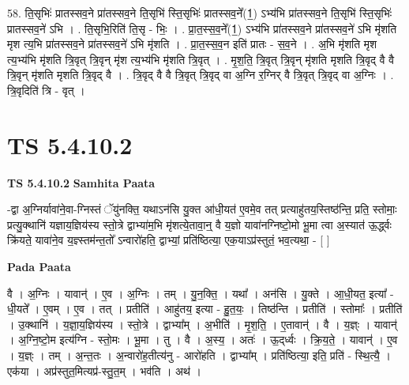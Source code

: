\documentclass[17pt]{extarticle}
\begin{document}
58. ति॒सृभिः॑ प्रातस्सव॒ने प्रा॑तस्सव॒ने ति॒सृभि॑ स्ति॒सृभिः॑ प्रातस्सव॒ने᳚(1॒) ऽभ्य॑भि प्रा॑तस्सव॒ने ति॒सृभि॑ स्ति॒सृभिः॑ प्रातस्सव॒ने॑ ऽभि । . ति॒सृभि॒रिति॑ ति॒सृ - भिः॒ । . प्रा॒त॒स्स॒व॒ने᳚(1॒) ऽभ्य॑भि प्रा॑तस्सव॒ने प्रा॑तस्सव॒ने॑ ऽभि मृ॑शति मृश त्य॒भि प्रा॑तस्सव॒ने प्रा॑तस्सव॒ने॑ ऽभि मृ॑शति । . प्रा॒त॒स्स॒व॒न इति॑ प्रातः - स॒व॒ने । . अ॒भि मृ॑शति मृश त्य॒भ्य॑भि मृ॑शति त्रि॒वृत् त्रि॒वृन् मृ॑श त्य॒भ्य॑भि मृ॑शति त्रि॒वृत् । . मृ॒श॒ति॒ त्रि॒वृत् त्रि॒वृन् मृ॑शति मृशति त्रि॒वृद् वै वै त्रि॒वृन् मृ॑शति मृशति त्रि॒वृद् वै । . त्रि॒वृद् वै वै त्रि॒वृत् त्रि॒वृद् वा अ॒ग्नि र॒ग्निर् वै त्रि॒वृत् त्रि॒वृद् वा अ॒ग्निः । . त्रि॒वृदिति॑ त्रि - वृत् । \newline
\pagebreak
{}

\section{ TS 5.4.10.2 }

\textbf{TS 5.4.10.2 } \newline
\textbf{Samhita Paata} \newline

-द्वा अ॒ग्निर्यावा॑ने॒वा-ग्निस्तं ॅयु॑नक्ति॒ यथाऽन॑सि यु॒क्त आ॑धी॒यत॑ ए॒वमे॒व तत् प्रत्याहु॑तय॒स्तिष्ठ॑न्ति॒ प्रति॒ स्तोमाः॒ प्रत्यु॒क्थानि॑ यज्ञाय॒ज्ञिय॑स्य स्तो॒त्रे द्वाभ्या॑म॒भि मृ॑शत्ये॒तावा॒न्॒ वै य॒ज्ञो यावा॑नग्निष्टो॒मो भू॒मा त्वा अ॒स्यात॑ ऊ॒र्द्ध्वः क्रि॑यते॒ यावा॑ने॒व य॒ज्ञ्स्तम॑न्त॒तो᳚ ऽन्वारो॑हति॒ द्वाभ्यां॒ प्रति॑ष्ठित्या॒ एक॒याऽप्र॑स्तुतं॒ भव॒त्यथा॒ - [  ] \newline

\textbf{Pada Paata} \newline

वै । अ॒ग्निः । यावान्॑ । ए॒व । अ॒ग्निः । तम् । यु॒न॒क्ति॒ । यथा᳚ । अन॑सि । यु॒क्ते । आ॒धी॒यत॒ इत्या᳚ - धी॒यते᳚ । ए॒वम् । ए॒व । तत् । प्रतीति॑ । आहु॑तय॒ इत्या - हु॒त॒यः॒ । तिष्ठ॑न्ति । प्रतीति॑ । स्तोमाः᳚ । प्रतीति॑ । उ॒क्थानि॑ । य॒ज्ञा॒य॒ज्ञिय॑स्य । स्तो॒त्रे । द्वाभ्या᳚म् । अ॒भीति॑ । मृ॒श॒ति॒ । ए॒तावान्॑ । वै । य॒ज्ञ्ः । यावान्॑ । अ॒ग्नि॒ष्टो॒म इत्य॑ग्नि - स्तो॒मः । भू॒मा । तु । वै । अ॒स्य॒ । अतः॑ । ऊ॒द्‌र्ध्वः । क्रि॒य॒ते॒ । यावान्॑ । ए॒व । य॒ज्ञ्ः । तम् । अ॒न्त॒तः । अ॒न्वारो॑ह॒तीत्य॑नु - आरो॑हति । द्वाभ्या᳚म् । प्रति॑ष्ठित्या॒ इति॒ प्रति॑ - स्थि॒त्यै॒ । एक॑या । अप्र॑स्तुत॒मित्यप्र॑-स्तु॒त॒म् । भव॑ति । अथ॑ ।  \newline
\end{document}
